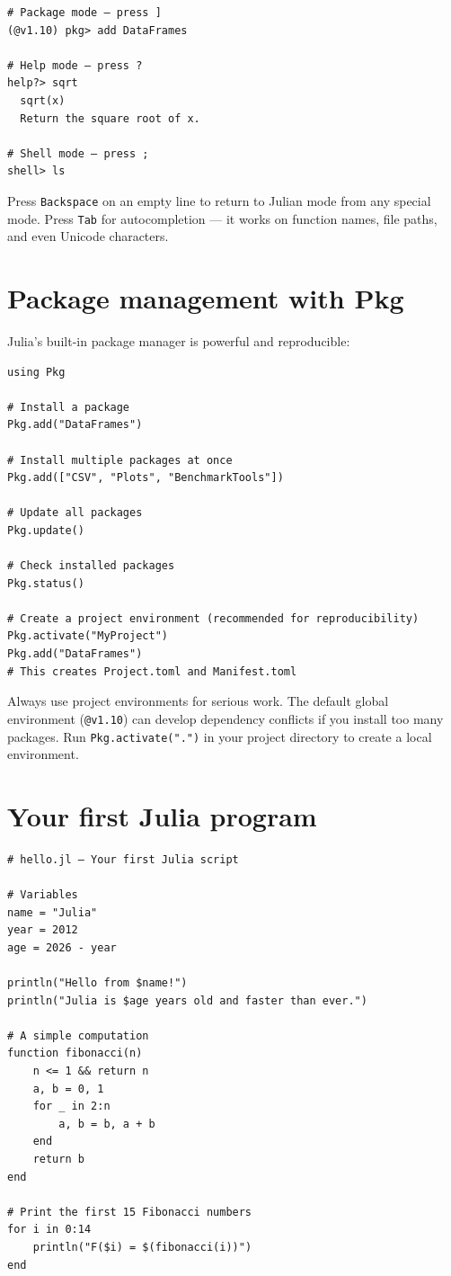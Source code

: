 \begin{verbatim}
# Package mode — press ]
(@v1.10) pkg> add DataFrames

# Help mode — press ?
help?> sqrt
  sqrt(x)
  Return the square root of x.

# Shell mode — press ;
shell> ls
\end{verbatim}

\begin{juliatip}
Press \texttt{Backspace} on an empty line to return to Julian mode from any special mode. Press \texttt{Tab} for autocompletion — it works on function names, file paths, and even Unicode characters.
\end{juliatip}

\section{Package management with Pkg}

Julia's built-in package manager is powerful and reproducible:

\begin{verbatim}
using Pkg

# Install a package
Pkg.add("DataFrames")

# Install multiple packages at once
Pkg.add(["CSV", "Plots", "BenchmarkTools"])

# Update all packages
Pkg.update()

# Check installed packages
Pkg.status()

# Create a project environment (recommended for reproducibility)
Pkg.activate("MyProject")
Pkg.add("DataFrames")
# This creates Project.toml and Manifest.toml
\end{verbatim}

\begin{warningbox}
Always use project environments for serious work. The default global environment (\texttt{@v1.10}) can develop dependency conflicts if you install too many packages. Run \texttt{Pkg.activate(".")} in your project directory to create a local environment.
\end{warningbox}

\section{Your first Julia program}

\begin{verbatim}
# hello.jl — Your first Julia script

# Variables
name = "Julia"
year = 2012
age = 2026 - year

println("Hello from $name!")
println("Julia is $age years old and faster than ever.")

# A simple computation
function fibonacci(n)
    n <= 1 && return n
    a, b = 0, 1
    for _ in 2:n
        a, b = b, a + b
    end
    return b
end

# Print the first 15 Fibonacci numbers
for i in 0:14
    println("F($i) = $(fibonacci(i))")
end
\end{verbatim}

